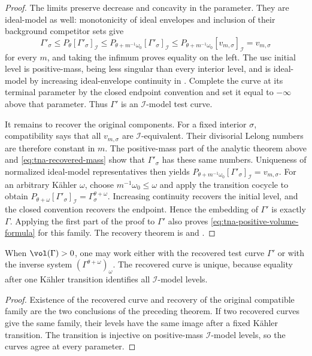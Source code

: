 \begin{proof}
The limits preserve decrease and concavity in the parameter.
They are ideal-model as well: monotonicity of ideal envelopes and
inclusion of their background competitor sets give
\[
 \Gamma'_\sigma\leq P_\theta[\Gamma'_\sigma]_{\mathcal I}
 \leq P_{\theta+m^{-1}\omega_0}[\Gamma'_\sigma]_{\mathcal I}
 \leq P_{\theta+m^{-1}\omega_0}[v_{m,\sigma}]_{\mathcal I}
 =v_{m,\sigma}
\]
for every $m$, and taking the infimum proves equality on the left.
The usc initial level is positive-mass, being less singular than every
interior level, and is ideal-model by increasing ideal-envelope
continuity in .
Complete the curve at its terminal parameter by the closed endpoint
convention and set it equal to $-\infty$ above that parameter.
Thus $\Gamma'$ is an $\mathcal I$-model test curve.

It remains to recover the original components.  For a fixed interior
$\sigma$, compatibility says that all $v_{m,\sigma}$ are
$\mathcal I$-equivalent.  Their divisorial Lelong numbers are therefore
constant in $m$.  The positive-mass part of the analytic theorem above
and \eqref{eq:tna-recovered-mass} show that $\Gamma'_\sigma$ has these
same numbers.  Uniqueness of normalized ideal-model representatives
then yields
$P_{\theta+m^{-1}\omega_0}[\Gamma'_\sigma]_{\mathcal I}=v_{m,\sigma}$.
For an arbitrary K\"ahler $\omega$, choose
$m^{-1}\omega_0\leq\omega$ and apply the transition cocycle to obtain
$P_{\theta+\omega}[\Gamma'_\sigma]_{\mathcal I}
 =\Gamma_\sigma^{\theta+\omega}$.
Increasing continuity recovers the initial level, and the closed
convention recovers the endpoint.  Hence the embedding of $\Gamma'$
is exactly $\Gamma$.  Applying the first part of the proof to $\Gamma'$
also proves \eqref{eq:tna-positive-volume-formula} for this family.
The recovery theorem is \cite[Lemma~13.1.2]{XiaBook} and
\cite[Lemma~3.10]{XiaOperationsV3}.
\end{proof}

\begin{corollary}\label{cor:tna-positive-no-ambiguity}
When $\vol(\Gamma)>0$, one may work either with the recovered test
curve $\Gamma'$ or with the inverse system
$(\Gamma^{\theta+\omega})_\omega$.  The recovered curve is unique,
because equality after one K\"ahler transition identifies all
$\mathcal I$-model levels.
\end{corollary}

\begin{proof}
Existence of the recovered curve and recovery of the original compatible
family are the two conclusions of the preceding theorem.  If two
recovered curves give the same family, their levels have the same image
after a fixed K\"ahler transition.  The transition is injective on
positive-mass $\mathcal I$-model levels, so the curves agree at every
parameter.
\end{proof}

